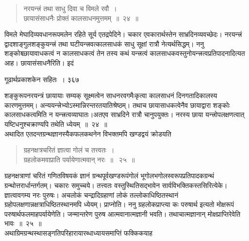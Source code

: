 \documentclass[11pt, openany]{book}
\begin{document}

 \begin{quote}
{\ssi नरयन्त्त्रं तथा साधु दिवा च विमले रवौ~।\\
छायासंसाधनैः प्रोक्तं कालसाधनमुत्तमम्~॥~२४~॥}
\end{quote}
 विमले मेघादिव्यवधानरूपमलेन रहिते सूर्य एतद्रपेदिने। चकार एवकारार्थस्तेन साभ्रदिनव्यवच्छेदः। नरयन्त्त्रं द्वादशाङ्गुलशङ्कुयन्त्त्रं तथा घटीयन्त्त्रवत्कालसाधकं साधु सूक्षां रात्रौ नेत्यर्थसिद्धम्। ननु शङ्कोश्च्छायावाधकत्वं न कालसाधकत्वं तेन तस्य कथं यन्त्त्रत्वं कालसाधकवस्तुनोयन्त्त्रत्वप्रतिपादनादित्यत आह। छायासंसाधनैरिति। इदं \textendash


\newpage


\hspace{3cm} गूढार्थप्रकाशकेन सहितः~। \hfill ३६७
\vspace{1cm}


\noindent शङ्कुरूपनरयन्त्रं छायायाः सम्यक् सूक्ष्मत्वेन साधनरवगमैःकृत्वा कालसाधनं दिनगतादिकालस्य कारणमुत्तमम्। अन्ययन्त्त्रेभ्योऽस्मान्निरन्तरतयातिश्रेष्ठम्। तथाच छायासाधकत्वेनैव छायाद्वारा शङ्कोः कालसाधकत्वमिति न यन्त्त्रत्वव्याघातः।अतएव साभ्रदिने रात्रौ चानुपयुक्तः। नरस्य छाया यन्त्त्रोपलक्षणत्वात् यष्टिधनुश्चक्राण्यपि तथेति ध्येयम्~॥~२४~॥\\
\noindent अथादित एतदन्तग्रन्थज्ञानस्यैकफलकथनेन विभक्तमपि खण्डद्वयं क्रोडयति \textendash


 \begin{quote}
{\ssi ग्रहनक्षत्रचरितं ज्ञात्वा गोलं च तत्त्वतः~।\\
ग्रहलोकमवाप्राति पर्यायेणात्मवान् नरः~॥~ २५~॥ }
\end{quote}
 ग्रहनक्षत्राणां चरितं गणितविषयकं ज्ञानं ग्रन्थपूर्वखण्डरूपंगोलं भूगोलभगोलस्वरूपप्रतिपादकग्रन्थं ग्रन्थोत्तरार्धान्तर्गतम्। चकारः समुच्चये। तत्त्वतः वस्तुस्थितिसद्भावेन सार्वविभक्तिकस्तसिरित्येके। ज्ञात्वावगम्य नरः पुरुषः। अचलोकं चन्द्रादिग्रहाणां लोकं तल्लोकाधिष्ठितस्थानं ग्रहोपलक्षणान्नक्षत्राधिष्ठितस्थानमपि ध्येयम्। प्राप्नोति। ननु ग्रहलोकप्राप्त्या कः परुषार्थ इत्यतो मोक्षरूपं परुषार्थफलमाह\textendash पर्यायेणेति। जन्मान्तरेण पुरुष आत्मवानात्मज्ञानी भवति। तथाचात्मज्ञानान् मोक्षप्राप्तिरेवेति भावः~॥~२५~॥ \\
\noindent  अथाग्रिमग्रन्थस्थासङ्गतिपरिहारायारब्धाध्यायसमाप्तिं फक्किकयाह 
\end{document}
